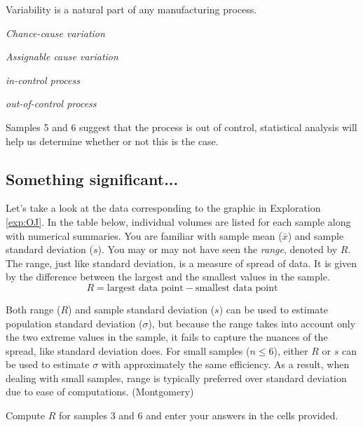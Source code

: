 \documentclass{ximera}
\begin{document}
Variability is a natural part of any manufacturing process.  

\emph{Chance-cause variation} 

\emph{Assignable cause variation}

\emph{in-control process} 

\emph{out-of-control process} 

Samples 5 and 6 suggest that the process is out of control, statistical analysis will help us determine whether or not this is the case. 

\subsection*{Something significant...}
Let's take a look at the data corresponding to the graphic in Exploration \ref{exp:OJ}.  In the table below, individual volumes are listed for each sample along with numerical summaries.  You are familiar with sample mean ($\bar{x}$) and sample standard deviation ($s$).  You may or may not have seen the  \emph{range}, denoted by $R$.  The range, just like standard deviation, is a measure of spread of data.  It is given by the difference between the largest and the smallest values in the sample.  
$$R=\text{largest data point}-\text{smallest data point}$$

Both range ($R$) and sample standard deviation ($s$) can be used to estimate population standard deviation ($\sigma$), but because the range takes into account only the two extreme values in the sample, it fails to capture the nuances of the spread, like standard deviation does.  For small samples ($n\leq 6$), either $R$ or $s$ can be used to estimate $\sigma$ with approximately the same efficiency.  As a result, when dealing with small samples, range is typically preferred over standard deviation due to ease of computations. (Montgomery)

Compute $R$ for samples 3 and 6 and enter your answers in the cells provided.
\end{document}
